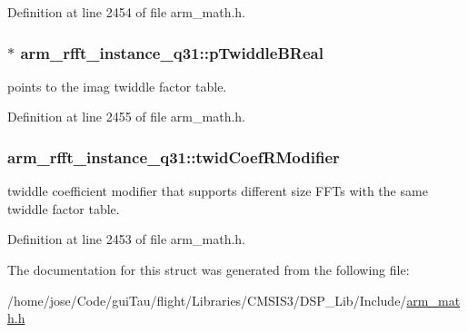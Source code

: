 Definition at line 2454 of file arm\-\_\-math.\-h.

\hypertarget{structarm__rfft__instance__q31_ae5070be4c2e0327e618f5e1f4c5b9d80}{
\subsubsection[{p\-Twiddle\-B\-Real}]{$\ast$ arm\-\_\-rfft\-\_\-instance\-\_\-q31\-::p\-Twiddle\-B\-Real}}\label{structarm__rfft__instance__q31_ae5070be4c2e0327e618f5e1f4c5b9d80}
points to the imag twiddle factor table. 

Definition at line 2455 of file arm\-\_\-math.\-h.

\hypertarget{structarm__rfft__instance__q31_a6fc90252b579f7c29e01bd279334fc43}{
\subsubsection[{twid\-Coef\-R\-Modifier}]{ arm\-\_\-rfft\-\_\-instance\-\_\-q31\-::twid\-Coef\-R\-Modifier}}\label{structarm__rfft__instance__q31_a6fc90252b579f7c29e01bd279334fc43}
twiddle coefficient modifier that supports different size F\-F\-Ts with the same twiddle factor table. 

Definition at line 2453 of file arm\-\_\-math.\-h.



The documentation for this struct was generated from the following file\-:\begin{DoxyCompactItemize}
\item 
/home/jose/\-Code/gui\-Tau/flight/\-Libraries/\-C\-M\-S\-I\-S3/\-D\-S\-P\-\_\-\-Lib/\-Include/\hyperlink{arm__math_8h}{arm\-\_\-math.\-h}\end{DoxyCompactItemize}
